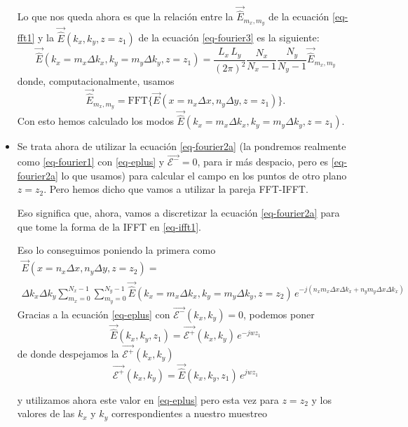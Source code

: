 \documentclass[twocolumn,tikz]{handout}
\begin{document}
\begin{itemize}
Lo que nos queda ahora es que la relación entre la
$\vec{\hat{E}}_{m_{x},m_{y}}$ de la ecuación \eqref{eq-fft1} y la
$\vec{\hat{E}}(k_{x},k_{y},z=z_{1})$ de la ecuación
\eqref{eq-fourier3} es la siguiente:
\begin{equation}
\vec{\hat{E}}(k_{x}=m_{x} \Delta k_{x},k_{y}=m_{y} \Delta
k_{y},z=z_{1})=\frac{L_{x}\,L_{y}}{(2\pi)^{2}}\frac{N_{x}}{N_{x}-1}\frac{N_{y}}{N_{y}-1}
\vec{\hat{E}}_{m_{x},m_{y}}
\end{equation}
donde, computacionalmente, usamos
\begin{equation}
\vec{\hat{E}}_{m_{x},m_{y}}=\mbox{FFT}\{\vec{E}(x=n_{x}\Delta
x,n_{y} \Delta y,z=z_{1})\}.
\end{equation}
Con esto hemos calculado los modos $\vec{\hat{E}}(k_{x}=m_{x} \Delta
k_{x},k_{y}=m_{y} \Delta k_{y},z=z_{1})$.

\item Se trata ahora de utilizar la ecuación \eqref{eq-fourier2a}
(la pondremos realmente como \eqref{eq-fourier1} con
\eqref{eq-eplus} y $\vec{\mathcal{E}^{-}}=0$, para ir más despacio,
pero es \eqref{eq-fourier2a} lo que usamos) para calcular el campo
en los puntos de otro plano $z=z_{2}$. Pero hemos dicho que vamos a
utilizar la pareja FFT-IFFT. 

Eso significa que, ahora, vamos a
discretizar la ecuación \eqref{eq-fourier2a} para que tome la forma
de la IFFT en \eqref{eq-ifft1}.

Eso lo conseguimos poniendo la
primera como
\begin{multline}
\vec{E}(x=n_{x}\Delta x,n_{y} \Delta y,z=z_{2})=\\
\Delta k_{x}
\Delta k_{y} \sum_{m_{x}=0}^{N_{x}-1}\sum_{m_{y}=0}^{N_{y}-1}
\vec{\hat{E}}(k_{x}=m_{x}\Delta k_{x},k_{y}=m_{y} \Delta
k_{y},z=z_{2}) \,e^{-j (n_{x} m_{x} \Delta x \Delta k_{x} +n_{y}
m_{y} \Delta x \Delta k_{x})}
\end{multline}
Gracias a la ecuación \eqref{eq-eplus} con
$\vec{\mathcal{E}^{-}}(k_{x},k_{y})=0$, podemos poner
\begin{equation}
\vec{\hat{E}}(k_{x},k_{y},z_{1})=\vec{\mathcal{E}^{+}}(k_{x},k_{y})\,e^{-j
w z_{1}}
\end{equation}
de donde despejamos la $\vec{\mathcal{E}^{+}}(k_{x},k_{y})$
\begin{equation}
\vec{\mathcal{E}^{+}}(k_{x},k_{y})=\vec{\hat{E}}(k_{x},k_{y},z_{1})\,e^{j
w z_{1}}
\end{equation}

y utilizamos ahora este valor en \eqref{eq-eplus} pero esta vez para
$z=z_{2}$ y los valores de las $k_{x}$ y $k_{y}$ correspondientes a
nuestro muestreo


\end{itemize}
\end{document}
